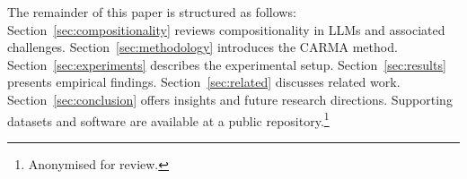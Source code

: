 The remainder of this paper is structured as follows: Section~\ref{sec:compositionality} reviews compositionality in LLMs and associated challenges. Section~\ref{sec:methodology} introduces the CARMA method. Section~\ref{sec:experiments} describes the experimental setup. Section~\ref{sec:results} presents empirical findings. Section~\ref{sec:related} discusses related work. Section~\ref{sec:conclusion} offers insights and future research directions. Supporting datasets and software are available at a public repository.\footnote{Anonymised for review.}  
